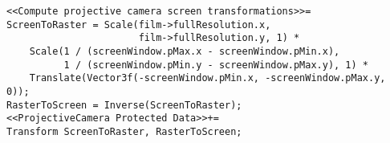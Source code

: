 \begin{lstlisting}
<<Compute projective camera screen transformations>>= 
ScreenToRaster = Scale(film->fullResolution.x, 
                       film->fullResolution.y, 1) *
    Scale(1 / (screenWindow.pMax.x - screenWindow.pMin.x),
          1 / (screenWindow.pMin.y - screenWindow.pMax.y), 1) *
    Translate(Vector3f(-screenWindow.pMin.x, -screenWindow.pMax.y, 0));
RasterToScreen = Inverse(ScreenToRaster);
<<ProjectiveCamera Protected Data>>+=  
Transform ScreenToRaster, RasterToScreen;
\end{lstlisting}